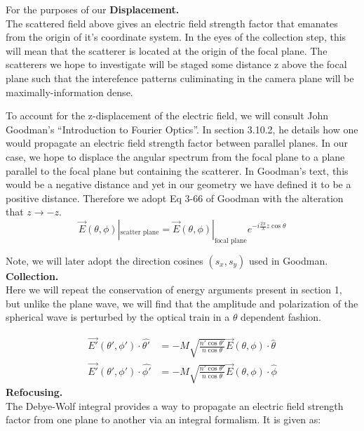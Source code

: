   For the purposes of our 
  {\bf Displacement.}\\
  The scattered field above gives an electric field strength factor that
  emanates from the origin of it's coordinate system. In the eyes of the
  collection step, this will mean that the scatterer is located at the origin
  of the focal plane. The scatterers we hope to investigate will be staged 
  some distance z above the focal plane such that the interefence patterns 
  culiminating in the camera plane will be maximally-information dense.

  To account for the z-displacement of the electric field, we will consult 
  John Goodman's ``Introduction to Fourier Optics''. In section 3.10.2, he 
  details
  how one would propagate an electric field strength factor between parallel
  planes. In our case, we hope to displace the 
  angular spectrum from the focal plane to a plane parallel to the focal plane
  but containing the scatterer. In Goodman's text\cite{goodman05}, this would be a negative
  distance and yet in our geometry we have defined it to be a positive distance.
  Therefore we adopt Eq 3-66 of Goodman with the alteration that  $z \rightarrow -z$.
  \begin{equation*}
    \vec{E}(\theta, \phi)|_{\text{scatter plane}} = \vec{E}(\theta, \phi)|_{\text{focal plane}} e^{-i\frac{2\pi}{\lambda}z\cos{\theta} }
  \end{equation*}

  Note, we will later adopt the direction cosines $(s_x, s_y)$ used in Goodman.
  {\bf Collection.}\\
  Here we will repeat the conservation of energy arguments present in section
  1, but unlike the plane wave, we will find that the amplitude and 
  polarization of the spherical wave is perturbed by the optical train in a 
  $\theta$ dependent fashion. 

  \begin{equation*}
    \begin{split}
    \vec{E'}(\theta', \phi')\cdot\hat{\theta'} & = - M \sqrt{ \frac{n'\cos{\theta'}}{n\cos{\theta}}}\vec{E}(\theta, \phi)\cdot\hat{\theta}\\
    \vec{E'}(\theta', \phi')\cdot\hat{\phi'} & = - M \sqrt{ \frac{n'\cos{\theta'}}{n\cos{\theta}}}\vec{E}(\theta, \phi)\cdot\hat{\phi}
    \end{split}
  \end{equation*}
{\bf Refocusing.}\\
  The Debye-Wolf integral provides a way to propagate an electric field strength
  factor from one plane to another via an integral formalism. It is given 
  as:

